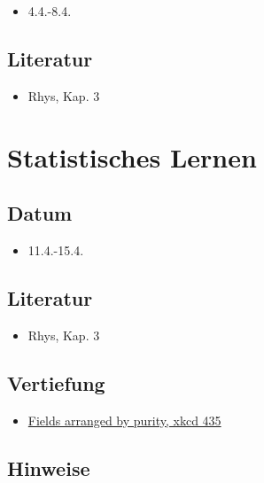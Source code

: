\documentclass[
]{book}
\providecommand{\tightlist}{%
  \setlength{\itemsep}{0pt}\setlength{\parskip}{0pt}}
\begin{document}
\begin{itemize}
\tightlist
\item
  4.4.-8.4.
\end{itemize}

\hypertarget{literatur-4}{%
\subsection{Literatur}\label{literatur-4}}

\begin{itemize}
\tightlist
\item
  Rhys, Kap. 3
\end{itemize}

\hypertarget{statistisches-lernen}{%
\section{Statistisches Lernen}\label{statistisches-lernen}}

\hypertarget{datum-4}{%
\subsection{Datum}\label{datum-4}}

\begin{itemize}
\tightlist
\item
  11.4.-15.4.
\end{itemize}

\hypertarget{literatur-5}{%
\subsection{Literatur}\label{literatur-5}}

\begin{itemize}
\tightlist
\item
  Rhys, Kap. 3
\end{itemize}

\hypertarget{vertiefung-1}{%
\subsection{Vertiefung}\label{vertiefung-1}}

\begin{itemize}
\tightlist
\item
  \href{https://xkcd.com/435/}{Fields arranged by purity, xkcd 435}
\end{itemize}

\hypertarget{hinweise-1}{%
\subsection{Hinweise}\label{hinweise-1}}
\end{document}
